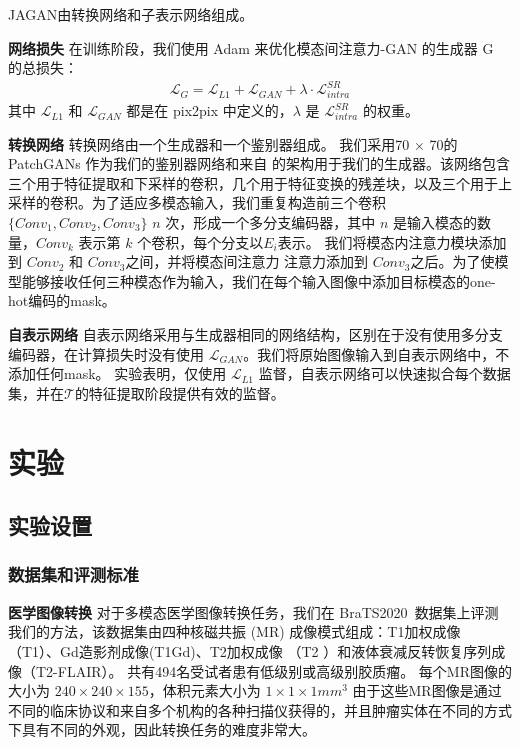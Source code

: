 JAGAN由转换网络和子表示网络组成。

\textbf{网络损失} 在训练阶段，我们使用 Adam 来优化模态间注意力-GAN 的生成器 G 的总损失：
\begin{align}
	\mathcal{L}_G = \mathcal{L}_{L1} + \mathcal{L}_{GAN} + \lambda  \cdot \mathcal{L}_{intra}^{SR}
\end{align}
其中 $\mathcal{L}_{L1}$ 和 $\mathcal{L}_{GAN}$ 都是在 pix2pix 中定义的，$\lambda$ 是 $\mathcal{L}_{intra}^{SR}$ 的权重。

\textbf{转换网络} 转换网络由一个生成器和一个鉴别器组成。 我们采用70 × 70的PatchGANs\cite{pix2pix} 作为我们的鉴别器网络和来自 \cite{perceptual} 的架构用于我们的生成器。该网络包含三个用于特征提取和下采样的卷积，几个用于特征变换的残差块，以及三个用于上采样的卷积。为了适应多模态输入，我们重复构造前三个卷积 $\{Conv_1, Conv_2, Conv_3\}$ $n$ 次，形成一个多分支编码器，其中 $n$ 是输入模态的数量，$ Conv_k$ 表示第 $k$ 个卷积，每个分支以$E_i$表示。 我们将模态内注意力模块添加到 $Conv_2$ 和 $Conv_3$之间，并将模态间注意力 注意力添加到 $Conv_3$之后。为了使模型能够接收任何三种模态作为输入，我们在每个输入图像中添加目标模态的one-hot编码的mask\cite{stargan}\cite{collagan}。

\textbf{自表示网络} 自表示网络采用与生成器相同的网络结构，区别在于没有使用多分支编码器，在计算损失时没有使用 $\mathcal{L}_{GAN}$。我们将原始图像输入到自表示网络中，不添加任何mask。 实验表明，仅使用 $\mathcal{L}_{L1}$ 监督，自表示网络可以快速拟合每个数据集，并在$\mathcal{T}$的特征提取阶段提供有效的监督。


\section{实验}

\subsection{实验设置}

\subsubsection{数据集和评测标准}

\textbf{医学图像转换}
对于多模态医学图像转换任务，我们在 BraTS2020~\cite{bakas2018identifying}数据集上评测我们的方法，该数据集由四种核磁共振 (MR) 成像模式组成：T1加权成像（T1）、Gd造影剂成像(T1Gd)、T2加权成像 （T2 ）和液体衰减反转恢复序列成像（T2-FLAIR）。 共有494名受试者患有低级别或高级别胶质瘤。 每个MR图像的大小为 $240\times240\times155$，体积元素大小为 $1\times 1\times 1 mm^3$ 由于这些MR图像是通过不同的临床协议和来自多个机构的各种扫描仪获得的，并且肿瘤实体在不同的方式下具有不同的外观，因此转换任务的难度非常大。

